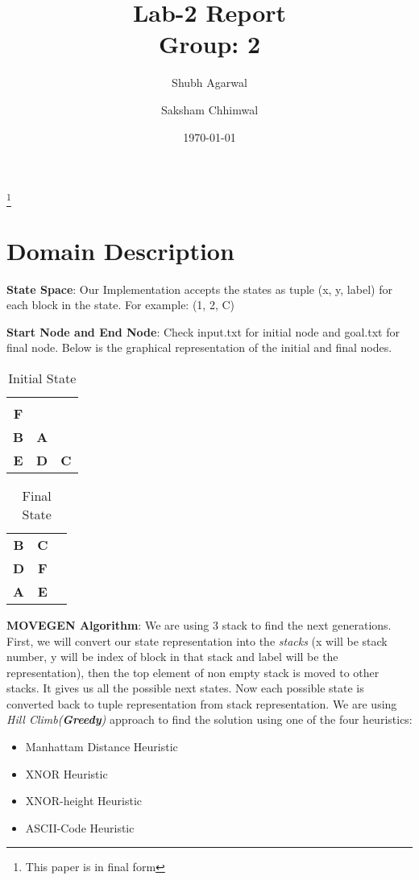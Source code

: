 \documentclass[a4paper,10pt,reqno,oneside]{amsart}
\begin{document}
\title[Block World Domain (Greedy Approach)]{Lab-2 Report\\Group: 2}
\author{Shubh Agarwal}
%

\author{Saksham Chhimwal}
%
\thanks{This paper is in final form}
\date{\today}

\maketitle

\section{Domain Description}

\textbf{State Space}: Our Implementation accepts the states as tuple (x, y, label) for each block in the state. 
For example: (1, 2, C)

\textbf{Start Node and End Node}: Check input.txt for initial node and goal.txt for final node. Below 
is the graphical representation of the initial and final nodes.

\begin{table}[h]
    \begin{tabular}{ccc}
    \textbf{}  & \textbf{}  & \textbf{}  \\
    \textbf{F} & \textbf{}  & \textbf{}  \\
    \textbf{B} & \textbf{A} & \textbf{}  \\
    \textbf{E} & \textbf{D} & \textbf{C}
    \end{tabular}
    \caption{Initial State}
\end{table}

\begin{table}[h]
    \begin{tabular}{ccc}
    \textbf{B} & \textbf{C} & \textbf{} \\
    \textbf{D} & \textbf{F} & \textbf{} \\
    \textbf{A} & \textbf{E} & \textbf{}
    \end{tabular}
    \caption{Final State}
\end{table}

\textbf{MOVEGEN Algorithm}: We are using 3 stack to find the next generations. First, we will convert 
our state representation into the \emph{stacks} (x will be stack number, y  will be index of block in that stack and label will 
be the representation), then the top element of non empty stack is moved to other stacks. It gives us all the possible next states. 
Now each possible state is converted back to tuple representation from stack representation. We are using 
\emph{Hill Climb(\textbf{Greedy})} approach to find the solution using one of the four heuristics:
\begin{itemize}
    \item Manhattam Distance Heuristic
    \item XNOR Heuristic
    \item XNOR-height Heuristic
    \item ASCII-Code Heuristic
\end{itemize}
\end{document}

